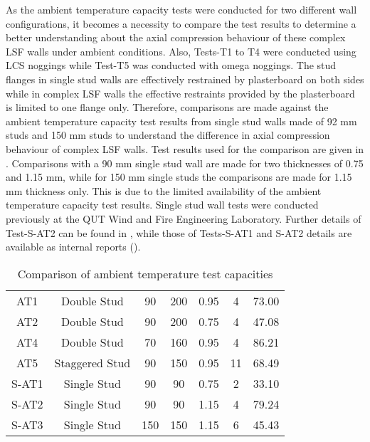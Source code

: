 As the ambient temperature capacity tests were conducted for two different wall configurations, it becomes a necessity to compare the test results to determine a better understanding about the axial compression behaviour of these complex LSF walls under ambient conditions. Also, Tests-T1 to T4 were conducted using LCS noggings while Test-T5 was conducted with omega noggings. The stud flanges in single stud walls are effectively restrained by plasterboard on both sides while in complex LSF walls the effective restraints provided by the plasterboard is limited to one flange only. Therefore, comparisons are made against the ambient temperature capacity test results from single stud walls made of 92 mm studs and 150 mm studs to understand the difference in axial compression behaviour of complex LSF walls. Test results used for the comparison are given in . Comparisons with a 90 mm single stud wall are made for two thicknesses of 0.75 and 1.15 mm, while for 150 mm single studs the comparisons are made for 1.15 mm thickness only. This is due to the limited availability of the ambient temperature capacity test results. Single stud wall tests were conducted previously at the QUT Wind and Fire Engineering Laboratory. Further details of Test-S-AT2 can be found in \citet{Gunalan2013e}, while those of Tests-S-AT1 and S-AT2 details are available as internal reports (\cite{Anthonypeer2016}). 
\begin{table}[!htbp]
	\centering
	\caption{Comparison of ambient temperature test capacities}
	\begin{tabular}{ccccccc}
		\toprule
		\multicolumn{1}{m{2.4em}}{\centering{Test Name}} & 
		\multicolumn{1}{m{5.6em}}{\centering{Description}} & 
		\multicolumn{1}{m{2.85em}}{\centering{Stud Depth (mm)}} & 
		\multicolumn{1}{m{2.85em}}{\centering{Cavity Depth (mm)}} & 
		\multicolumn{1}{m{5em}}{\centering{Stud Thickness (mm)}} & 
		\multicolumn{1}{m{3em}}{\centering{No of Studs}} &
		\multicolumn{1}{m{3em}}{\centering{Failure Load (kN)}} \\
		\midrule
		AT1  & Double Stud & 90 & 200 & 0.95 & 4 & 73.00 \\
		AT2  & Double Stud & 90 & 200 & 0.75 & 4 & 47.08 \\
		AT4  & Double Stud & 70 & 160 & 0.95 & 4 & 86.21 \\
		AT5  & Staggered Stud & 90 & 150 & 0.95 & 11 & 68.49 \\
		S-AT1 & Single Stud & 90 & 90 & 0.75 & 2 & 33.10 \\
		S-AT2 & Single Stud & 90 & 90 & 1.15 & 4 & 79.24 \\
		S-AT3 & Single Stud & 150 & 150 & 1.15 & 6 & 45.43 \\
		\bottomrule
	\end{tabular}%
	\label{tab:ambient-test-results-comparison}%
\end{table}%

